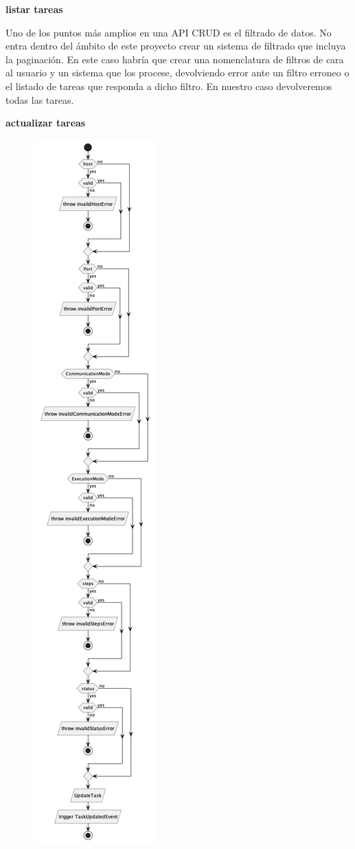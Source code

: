 \textbf{listar tareas}

Uno de los puntos más amplios en una API CRUD es el filtrado de datos. No entra dentro del ámbito de este proyecto crear un sistema de filtrado que incluya la paginación. En este caso habría que crear una nomenclatura de filtros de cara al usuario y un sistema que los procese, devolviendo error ante un filtro erroneo o el listado de tareas que responda a dicho filtro. En nuestro caso devolveremos todas las tareas.

\textbf{actualizar tareas}

\begin{figure}[H]
    \centering
    \includegraphics[height=0.5\textheight]{./part/Proyecto_ejecutivo/memoria_descriptiva/descripcionDelProyecto/manager/uml/updateTaskUseCase}
    \caption[Diagrama de objetos de dominio]{}\label{fig:updateTaskUseCase}
\end{figure}


